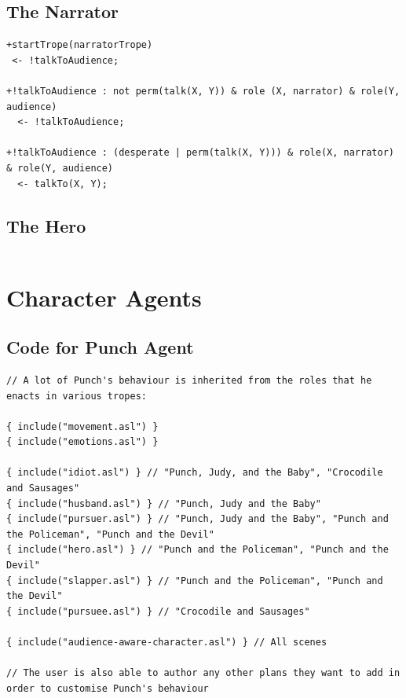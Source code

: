 \documentclass[11pt]{report}
\begin{document}
\subsection{The Narrator}

\begin{lstlisting}[showstringspaces=false,
label=lst:pjfull-heroagent,caption={AgentSpeak code for the ``Hero'' role}]
+startTrope(narratorTrope)
 <- !talkToAudience;

+!talkToAudience : not perm(talk(X, Y)) & role (X, narrator) & role(Y, audience)
  <- !talkToAudience;

+!talkToAudience : (desperate | perm(talk(X, Y))) & role(X, narrator) & role(Y, audience)
  <- talkTo(X, Y);
\end{lstlisting}

\subsection{The Hero}

\begin{lstlisting}[showstringspaces=false,
label=lst:pjfull-heroagent,caption={AgentSpeak code for the ``Hero'' role}]
\end{lstlisting}

\section{Character Agents}
\label{sec:asl-character-agents}

\subsection{Code for Punch Agent}
\begin{lstlisting}[showstringspaces=false,
label=lst:app-pjfull-punchagent,caption={AgentSpeak code for the Punch agent}]
// A lot of Punch's behaviour is inherited from the roles that he enacts in various tropes:

{ include("movement.asl") }
{ include("emotions.asl") }

{ include("idiot.asl") } // "Punch, Judy, and the Baby", "Crocodile and Sausages"
{ include("husband.asl") } // "Punch, Judy and the Baby"
{ include("pursuer.asl") } // "Punch, Judy and the Baby", "Punch and the Policeman", "Punch and the Devil"
{ include("hero.asl") } // "Punch and the Policeman", "Punch and the Devil"
{ include("slapper.asl") } // "Punch and the Policeman", "Punch and the Devil"
{ include("pursuee.asl") } // "Crocodile and Sausages"

{ include("audience-aware-character.asl") } // All scenes

// The user is also able to author any other plans they want to add in order to customise Punch's behaviour
\end{lstlisting}
\end{document}
